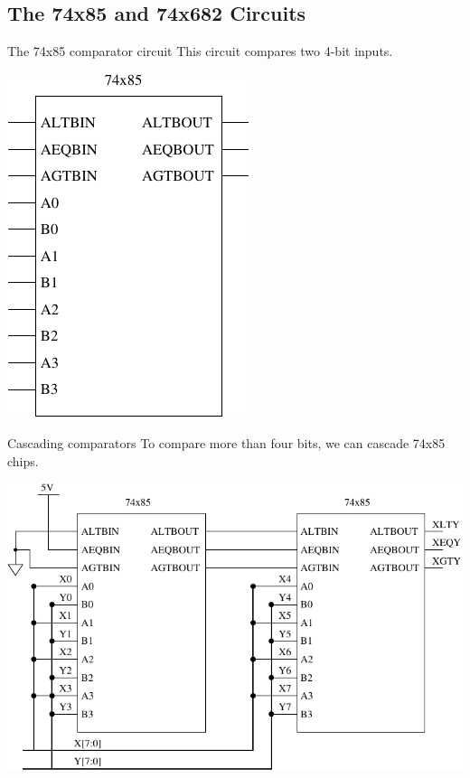 \subsection{The 74x85 and 74x682 Circuits}

\begin{frame}{The 74x85 comparator circuit}
  This circuit compares two 4-bit inputs.\\
  \begin{center}
    \includegraphics{74x85Schematic}
  \end{center}
\end{frame}

\begin{frame}{Cascading comparators}
  To compare more than four bits, we can cascade 74x85 chips.\\
  \begin{center}
    \includegraphics[scale=0.8]{EightBitComparator}
  \end{center}
\end{frame}

